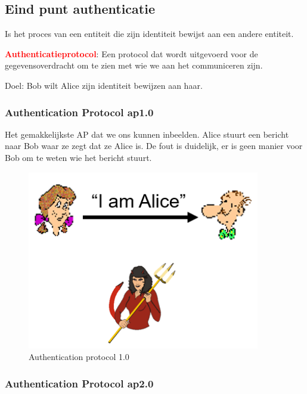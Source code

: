 \subsection{Eind punt authenticatie}
Is het proces van een entiteit die zijn identiteit bewijst aan een andere entiteit.

\noindent \textcolor{red}{\textbf{Authenticatieprotocol}}: Een protocol dat wordt uitgevoerd voor de gegevensoverdracht om te zien met wie we aan het communiceren zijn.

\noindent Doel: Bob wilt Alice zijn identiteit bewijzen aan haar. 
\subsubsection{Authentication Protocol ap1.0}

Het gemakkelijkste AP dat we ons kunnen inbeelden. Alice stuurt een bericht naar Bob waar ze zegt dat ze Alice is.
De fout is duidelijk, er is geen manier voor Bob om te weten wie het bericht stuurt.


\begin{figure}[h]
    \centering
    \includegraphics[width=4in]{./img/imghfdst8/hfdst8puntje13.png}
    \caption{Authentication protocol 1.0}      
    \label{fig:Authentication protocol 1.0 }
\end{figure}

\subsubsection{Authentication Protocol ap2.0}

